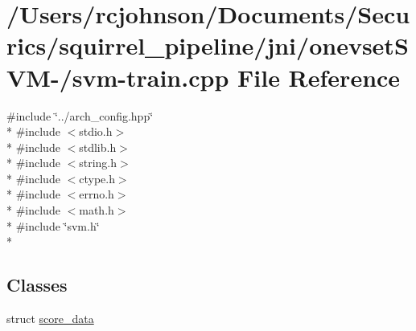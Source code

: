 \hypertarget{_2svm-train_8cpp}{\section{/\-Users/rcjohnson/\-Documents/\-Securics/squirrel\-\_\-pipeline/jni/onevset\-S\-V\-M-\//svm-\/train.cpp File Reference}
\label{_2svm-train_8cpp}
}
{\ttfamily \#include \char`\"{}../arch\-\_\-config.\-hpp\char`\"{}}\\*
{\ttfamily \#include $<$stdio.\-h$>$}\\*
{\ttfamily \#include $<$stdlib.\-h$>$}\\*
{\ttfamily \#include $<$string.\-h$>$}\\*
{\ttfamily \#include $<$ctype.\-h$>$}\\*
{\ttfamily \#include $<$errno.\-h$>$}\\*
{\ttfamily \#include $<$math.\-h$>$}\\*
{\ttfamily \#include \char`\"{}svm.\-h\char`\"{}}\\*
\subsection*{Classes}
\begin{DoxyCompactItemize}
\item 
struct \hyperlink{structscore__data}{score\-\_\-data}
\end{DoxyCompactItemize}
